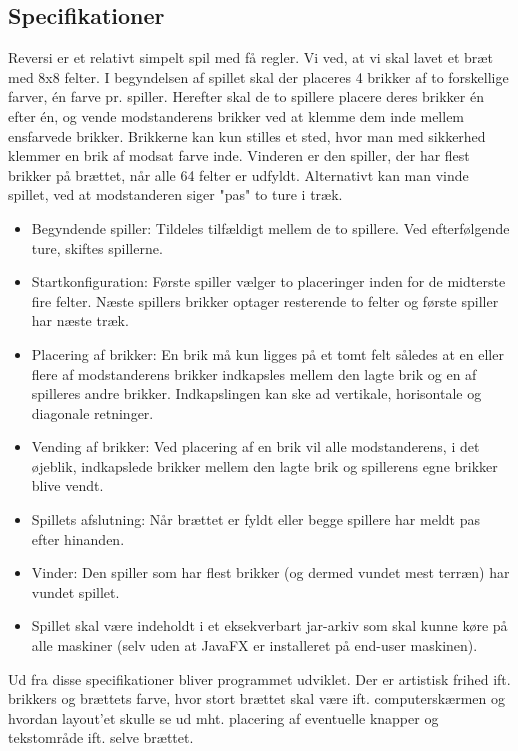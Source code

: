 \subsection{Specifikationer}
Reversi er et relativt simpelt spil med få regler. Vi ved, at vi skal lavet et bræt med 8x8 felter. I begyndelsen af spillet skal der placeres 4 brikker af to forskellige farver, én farve pr. spiller. Herefter skal de to spillere placere deres brikker én efter én, og vende modstanderens brikker ved at klemme dem inde mellem ensfarvede brikker. Brikkerne kan kun stilles et sted, hvor man med sikkerhed klemmer en brik af modsat farve inde. Vinderen er den spiller, der har flest brikker på brættet, når alle 64 felter er udfyldt. Alternativt kan man vinde spillet, ved at modstanderen siger "pas" to ture i træk.
\begin{itemize}
    \item Begyndende spiller: Tildeles tilfældigt mellem de to spillere. Ved efterfølgende ture, skiftes spillerne.
    \item Startkonfiguration: Første spiller vælger to placeringer inden for de midterste fire felter. Næste spillers brikker optager resterende to felter og første spiller har næste træk.
    \item Placering af brikker: En brik må kun ligges på et tomt felt således at en eller flere af modstanderens brikker indkapsles mellem den lagte brik og en af spilleres andre brikker. Indkapslingen kan ske ad vertikale, horisontale og diagonale retninger.
    \item Vending af brikker: Ved placering af en brik vil alle modstanderens, i det øjeblik, indkapslede brikker mellem den lagte brik og spillerens egne brikker blive vendt.
    \item Spillets afslutning: Når brættet er fyldt eller begge spillere har meldt pas efter hinanden.
    \item Vinder: Den spiller som har flest brikker (og dermed vundet mest terræn) har vundet spillet.
    \item Spillet skal være indeholdt i et eksekverbart jar-arkiv som skal kunne køre på alle maskiner (selv uden at JavaFX er installeret på end-user maskinen).
\end{itemize}
Ud fra disse specifikationer bliver programmet udviklet. Der er artistisk frihed ift. brikkers og brættets farve, hvor stort brættet skal være ift. computerskærmen og hvordan layout'et skulle se ud mht. placering af eventuelle knapper og tekstområde ift. selve brættet. 
